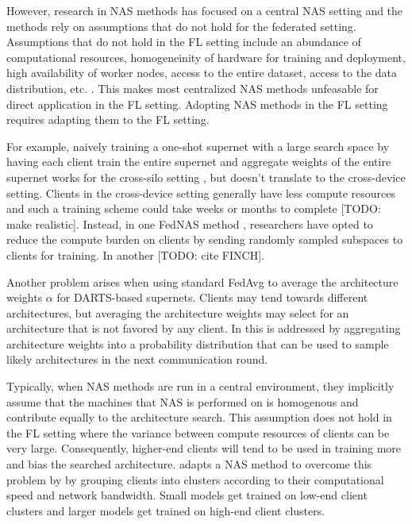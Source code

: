 However, research in NAS methods has focused on a central NAS setting and the methods rely on assumptions that do not hold for the federated setting. Assumptions that do not hold in the FL setting include an abundance of computational resources, homogeneinity of hardware for training and deployment, high availability of worker nodes, access to the entire dataset, access to the data distribution, etc. \cite{fl_advances_and_open_problems_2021}. This makes most centralized NAS methods unfeasable for direct application in the FL setting. Adopting NAS methods in the FL setting requires adapting them to the FL setting. 

For example, naively training a one-shot supernet with a large search space by having each client train the entire supernet and aggregate weights of the entire supernet works for the cross-silo setting \cite{fednas_2021}, but doesn't translate to the cross-device setting. Clients in the cross-device setting generally have less compute resources and such a training scheme could take weeks or months to complete [TODO: make realistic]. Instead, in one FedNAS method \cite{fedoras_2022}, researchers have opted to reduce the compute burden on clients by sending randomly sampled subspaces to clients for training. In another [TODO: cite FINCH].

Another problem arises when using standard FedAvg to average the architecture weights $\alpha$ for DARTS-based supernets. Clients may tend towards different architectures, but averaging the architecture weights may select for an architecture that is not favored by any client. In \cite{efnas_2024} this is addressed by aggregating architecture weights into a probability distribution that can be used to sample likely architectures in the next communication round.

Typically, when NAS methods are run in a central environment, they implicitly assume that the machines that NAS is performed on is homogenous and contribute equally to the architecture search. This assumption does not hold in the FL setting where the variance between compute resources of clients can be very large. Consequently, higher-end clients will tend to be used in training more and bias the searched architecture. \cite{network_aware_fed_nas_2025} adapts a NAS method to overcome this problem by by grouping clients into clusters according to their computational speed and network bandwidth. Small models get trained on low-end client clusters and larger models get trained on high-end client clusters. 

